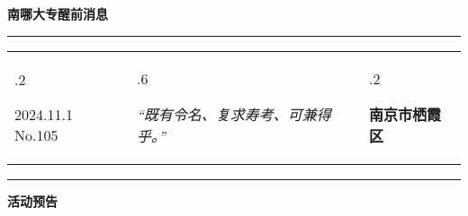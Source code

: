 \documentclass[letterpaper, 12pt]{article}
\begin{document}
\begin{center}
    \Huge\textbf{南哪大专醒前消息}
\end{center}
\vspace{4mm}
\hrule
\renewcommand\tabularxcolumn[1]{m{#1}}
\begin{tabularx}{\textwidth}{>{\hsize.2\hsize}X>{\hsize.6\hsize}X>{\hsize.2\hsize}X}
    \begin{flushleft}
        2024.11.1\, No.105
    \end{flushleft}
    &
    \begin{center}
        \textit{“既有令名、复求寿考、可兼得乎。”}
    \end{center}
    &
    \begin{flushright}
        \textbf{南京市栖霞区}
    \end{flushright}
\end{tabularx}
\vspace{-3.5mm}
\hrule
\vspace{4mm}
\centerline{\huge\textbf{活动预告}}
\end{document}
